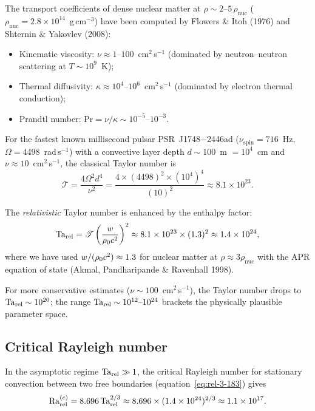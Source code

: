 The transport coefficients of dense nuclear matter at
$\rho \sim 2\text{--}5\,\rho_{\mathrm{nuc}}$
($\rho_{\mathrm{nuc}} = 2.8 \times 10^{14}$~g\,cm$^{-3}$) have been
computed by Flowers \& Itoh (1976) and Shternin \& Yakovlev (2008):
\begin{itemize}
  \item Kinematic viscosity:
    $\nu \approx 1\text{--}100$~cm$^{2}$\,s$^{-1}$
    (dominated by neutron--neutron scattering at $T \sim 10^{9}$~K);
  \item Thermal diffusivity:
    $\kappa \approx 10^{4}\text{--}10^{6}$~cm$^{2}$\,s$^{-1}$
    (dominated by electron thermal conduction);
  \item Prandtl number:
    $\mathrm{Pr} = \nu/\kappa \sim 10^{-5}\text{--}10^{-3}$.
\end{itemize}

For the fastest known millisecond pulsar PSR~J1748$-$2446ad
($\nu_{\mathrm{spin}} = 716$~Hz, $\Omega = 4498$~rad\,s$^{-1}$)
with a convective layer depth $d \sim 100$~m $= 10^{4}$~cm
and $\nu \approx 10$~cm$^{2}$\,s$^{-1}$, the classical Taylor number is
\begin{equation}\label{eq:rel-3-app-Ta-estimate}
  \mathscr{T}
  = \frac{4\Omega^{2}d^{4}}{\nu^{2}}
  = \frac{4 \times (4498)^{2} \times (10^{4})^{4}}{(10)^{2}}
  \approx 8.1 \times 10^{23}.
\end{equation}

The \emph{relativistic} Taylor number is enhanced by the enthalpy factor:
\begin{equation}\label{eq:rel-3-app-Tarel}
  \mathrm{Ta}_{\mathrm{rel}}
  = \mathscr{T}\left(\frac{w}{\rho_0 c^{2}}\right)^{2}
  \approx 8.1 \times 10^{23} \times (1.3)^{2}
  \approx 1.4 \times 10^{24},
\end{equation}
where we have used $w/(\rho_0 c^{2}) \approx 1.3$ for
nuclear matter at $\rho \approx 3\rho_{\mathrm{nuc}}$ with the APR
equation of state (Akmal, Pandharipande \& Ravenhall 1998).

For more conservative estimates ($\nu \sim 100$~cm$^{2}$\,s$^{-1}$),
the Taylor number drops to $\mathrm{Ta}_{\mathrm{rel}} \sim 10^{20}$; the range
$\mathrm{Ta}_{\mathrm{rel}} \sim 10^{12}\text{--}10^{24}$ brackets the physically
plausible parameter space.

\subsection{Critical Rayleigh number}

In the asymptotic regime $\mathrm{Ta}_{\mathrm{rel}} \gg 1$, the critical Rayleigh number
for stationary convection between two free boundaries
(equation~\eqref{eq:rel-3-183}) gives
\begin{equation}\label{eq:rel-3-app-Rac}
  \mathrm{Ra}_{\mathrm{rel}}^{(c)}
  = 8.696\,\mathrm{Ta}_{\mathrm{rel}}^{2/3}
  \approx 8.696 \times (1.4 \times 10^{24})^{2/3}
  \approx 1.1 \times 10^{17}.
\end{equation}

